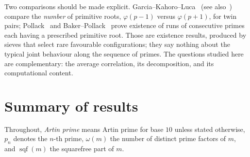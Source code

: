 \documentclass[11pt,reqno]{amsart}
\theoremstyle{plain}
\theoremstyle{definition}
\DeclareMathOperator{\sqf}{sqf}
\begin{document}
Two comparisons should be made explicit. Garcia--Kahoro--Luca~\cite{GarciaKahoroLuca2019}
(see also~\cite{GarciaLucaShiUdell2020}) compare the \emph{number} of primitive roots,
$\varphi(p-1)$ versus $\varphi(p+1)$, for twin pairs; Pollack~\cite{Pollack2014} and
Baker--Pollack~\cite{BakerPollack2016} prove existence of runs of consecutive primes each
having a prescribed primitive root. Those are existence results, produced by sieves that
select rare favourable configurations; they say nothing about the typical joint behaviour
along the sequence of primes. The questions studied here are complementary: the average
correlation, its decomposition, and its computational content.

\section{Summary of results}
\label{sec:summary}

Throughout, \emph{Artin prime} means Artin prime for base $10$ unless stated otherwise,
$p_n$ denotes the $n$-th prime, $\omega(m)$ the number of distinct prime factors of $m$,
and $\sqf(m)$ the squarefree part of $m$.
\end{document}
